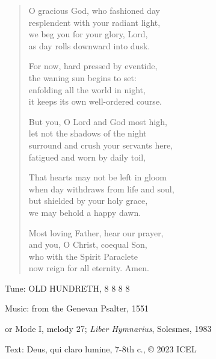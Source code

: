 \hymn

\begin{verse}
O gracious God, who fashioned day\\
resplendent with your radiant light,\\
we beg you for your glory, Lord,\\
as day rolls downward into dusk.

For now, hard pressed by eventide,\\
the waning sun begins to set:\\
enfolding all the world in night,\\
it keeps its own well-ordered course.

But you, O Lord and God most high,\\
let not the shadows of the night\\
surround and crush your servants here,\\
fatigued and worn by daily toil,

That hearts may not be left in gloom\\
when day withdraws from life and soul,\\
but shielded by your holy grace,\\
we may behold a happy dawn.

Most loving Father, hear our prayer,\\
and you, O Christ, coequal Son,\\
who with the Spirit Paraclete\\
now reign for all eternity. Amen.
\end{verse}

\begin{hymnsource}
Tune: OLD HUNDRETH, 8 8 8 8

Music: from the Genevan Psalter, 1551

or Mode I, melody 27; \emph{Liber Hymnarius}, Solesmes, 1983

Text: Deus, qui claro lumine, 7-8th c., © 2023 ICEL
\end{hymnsource}